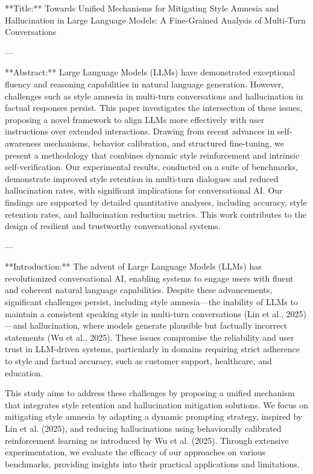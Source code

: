 **Title:**  
Towards Unified Mechanisms for Mitigating Style Amnesia and Hallucination in Large Language Models: A Fine-Grained Analysis of Multi-Turn Conversations

---

**Abstract:**  
Large Language Models (LLMs) have demonstrated exceptional fluency and reasoning capabilities in natural language generation. However, challenges such as style amnesia in multi-turn conversations and hallucination in factual responses persist. This paper investigates the intersection of these issues, proposing a novel framework to align LLMs more effectively with user instructions over extended interactions. Drawing from recent advances in self-awareness mechanisms, behavior calibration, and structured fine-tuning, we present a methodology that combines dynamic style reinforcement and intrinsic self-verification. Our experimental results, conducted on a suite of benchmarks, demonstrate improved style retention in multi-turn dialogues and reduced hallucination rates, with significant implications for conversational AI. Our findings are supported by detailed quantitative analyses, including accuracy, style retention rates, and hallucination reduction metrics. This work contributes to the design of resilient and trustworthy conversational systems.

---

**Introduction:**  
The advent of Large Language Models (LLMs) has revolutionized conversational AI, enabling systems to engage users with fluent and coherent natural language capabilities. Despite these advancements, significant challenges persist, including style amnesia—the inability of LLMs to maintain a consistent speaking style in multi-turn conversations (Lin et al., 2025)—and hallucination, where models generate plausible but factually incorrect statements (Wu et al., 2025). These issues compromise the reliability and user trust in LLM-driven systems, particularly in domains requiring strict adherence to style and factual accuracy, such as customer support, healthcare, and education.

This study aims to address these challenges by proposing a unified mechanism that integrates style retention and hallucination mitigation solutions. We focus on mitigating style amnesia by adapting a dynamic prompting strategy, inspired by Lin et al. (2025), and reducing hallucinations using behaviorally calibrated reinforcement learning as introduced by Wu et al. (2025). Through extensive experimentation, we evaluate the efficacy of our approaches on various benchmarks, providing insights into their practical applications and limitations.

